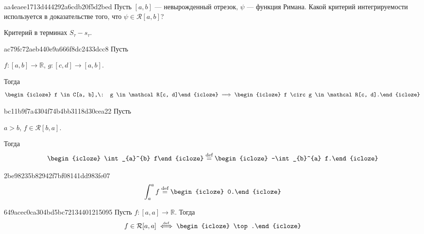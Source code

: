 \begin{note}{aa4eaee1713d444292a6cdb20f5d2bed}
    Пусть \({ [a, b]  }\) --- невырожденный отрезок, \({ \psi }\) --- функция Римана.
    Какой критерий интегрируемости используется в доказательстве того, что \({ \psi \in \mathcal R[a, b] }\)?

    \begin{cloze}{1}
        Критерий в терминах \({ S_\tau - s_\tau }\).
    \end{cloze}
\end{note}

\begin{note}{ac79fc72aeb440e9a666f8dc2433dcc8}
    Пусть \begin{icloze}{3}\({ f : [a, b] \to \mathbb R }\), \({ g : [c, d] \to [a, b] }\).\end{icloze}
    Тогда
    \[
        \begin{icloze}{2}f \in C[a, b],\:  g \in \mathcal R[c, d]\end{icloze} \implies \begin{icloze}{1}f \circ g \in \mathcal R[c, d].\end{icloze}
    \]
\end{note}

\begin{note}{bc11b9f7a4304f74b4bb3118d30cea22}
    Пусть \begin{icloze}{3}\({ a > b }\), \({ f \in \mathcal R[b, a] }\).\end{icloze} Тогда
    \[
        \begin{icloze}{2}\int_{a}^{b} f\end{icloze} \overset{\text{def}}= \begin{icloze}{1}-\int_{b}^{a} f.\end{icloze}
    \]
\end{note}

\begin{note}{2be98235b82942f7bf08141dd983fe07}
    \[
        \int_{a}^{a} f \overset{\text{def}}= \begin{icloze}{1}0.\end{icloze}
    \]
\end{note}

\begin{note}{649acec0ca304bd5bc72134401215095}
    Пусть \({ f : [a, a] \to \mathbb R }\). Тогда
    \[
        f \in \mathcal R[a, a] \overset{\hspace{-1pt}\text{\tiny def}}\iff \begin{icloze}{1}\top.\end{icloze}
    \]
\end{note}

